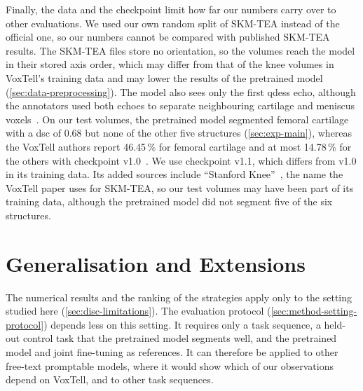 Finally, the data and the checkpoint limit how far our numbers carry over to other evaluations.
We used our own random split of SKM-TEA instead of the official one, so our numbers cannot be compared with published SKM-TEA results.
The SKM-TEA files store no orientation, so the volumes reach the model in their stored axis order, which may differ from that of the knee volumes in VoxTell's training data and may lower the results of the pretrained model (\cref{sec:data-preprocessing}).
The model also sees only the first \gls{qdess} echo, although the annotators used both echoes to separate neighbouring cartilage and meniscus voxels~\cite[App.~A.4]{desai2021skmtea}.
On our test volumes, the pretrained model segmented femoral cartilage with a \gls{dsc} of 0.68 but none of the other five structures (\cref{sec:exp-main}), whereas the VoxTell authors report 46.45\,\% for femoral cartilage and at most 14.78\,\% for the others with checkpoint v1.0~\cites[Suppl.~Table~9]{rokuss2025voxtellfreetextpromptableuniversal}{rokuss2026voxtellmodelcard}.
We use checkpoint v1.1, which differs from v1.0 in its training data.
Its added sources include ``Stanford Knee''~\cite{rokuss2026voxtellissue15}, the name the VoxTell paper uses for SKM-TEA, so our test volumes may have been part of its training data, although the pretrained model did not segment five of the six structures.

\section{Generalisation and Extensions}
\label{sec:disc-generalisation}


The numerical results and the ranking of the strategies apply only to the setting studied here (\cref{sec:disc-limitations}).
The evaluation protocol (\cref{sec:method-setting-protocol}) depends less on this setting.
It requires only a task sequence, a held-out control task that the pretrained model segments well, and the pretrained model and joint fine-tuning as references.
It can therefore be applied to other free-text promptable models, where it would show which of our observations depend on VoxTell, and to other task sequences.

